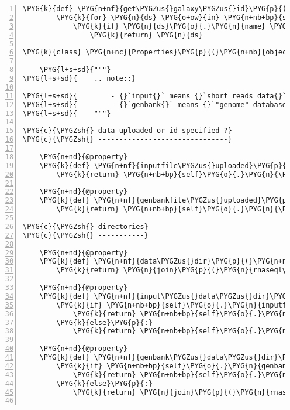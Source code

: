 \begin{Verbatim}[commandchars=\\\{\},numbers=left,firstnumber=1,stepnumber=5]
    \PYG{k}{def} \PYG{n+nf}{get\PYGZus{}galaxy\PYGZus{}id}\PYG{p}{(}\PYG{n+nb+bp}{self}\PYG{p}{,} \PYG{n}{name}\PYG{p}{)}\PYG{p}{:}
        \PYG{k}{for} \PYG{n}{ds} \PYG{o+ow}{in} \PYG{n+nb+bp}{self}\PYG{o}{.}\PYG{n}{galaxy\PYGZus{}datasets}\PYG{p}{:}
            \PYG{k}{if} \PYG{n}{ds}\PYG{o}{.}\PYG{n}{name} \PYG{o}{==} \PYG{n}{name}\PYG{p}{:}
                \PYG{k}{return} \PYG{n}{ds}

\PYG{k}{class} \PYG{n+nc}{Properties}\PYG{p}{(}\PYG{n+nb}{object}\PYG{p}{)}\PYG{p}{:}

    \PYG{l+s+sd}{"""}
\PYG{l+s+sd}{    .. note::}

\PYG{l+s+sd}{        - {}`input{}` means {}`short reads data{}`}
\PYG{l+s+sd}{        - {}`genbank{}` means {}`"genome" database nucleotide sequence{}`}
\PYG{l+s+sd}{    """}

\PYG{c}{\PYGZsh{} data uploaded or id specified ?}
\PYG{c}{\PYGZsh{} -------------------------------}

    \PYG{n+nd}{@property}
    \PYG{k}{def} \PYG{n+nf}{inputfile\PYGZus{}uploaded}\PYG{p}{(}\PYG{n+nb+bp}{self}\PYG{p}{)}\PYG{p}{:}
        \PYG{k}{return} \PYG{n+nb+bp}{self}\PYG{o}{.}\PYG{n}{\PYGZus{}inputfile\PYGZus{}name} \PYG{o+ow}{and} \PYG{n+nb+bp}{True}

    \PYG{n+nd}{@property}
    \PYG{k}{def} \PYG{n+nf}{genbankfile\PYGZus{}uploaded}\PYG{p}{(}\PYG{n+nb+bp}{self}\PYG{p}{)}\PYG{p}{:}
        \PYG{k}{return} \PYG{n+nb+bp}{self}\PYG{o}{.}\PYG{n}{\PYGZus{}genbankfile\PYGZus{}name} \PYG{o+ow}{and} \PYG{n+nb+bp}{True}

\PYG{c}{\PYGZsh{} directories}
\PYG{c}{\PYGZsh{} -----------}

    \PYG{n+nd}{@property}
    \PYG{k}{def} \PYG{n+nf}{data\PYGZus{}dir}\PYG{p}{(}\PYG{n+nb+bp}{self}\PYG{p}{)}\PYG{p}{:}
        \PYG{k}{return} \PYG{n}{join}\PYG{p}{(}\PYG{n}{rnaseqlyze}\PYG{o}{.}\PYG{n}{analyses\PYGZus{}path}\PYG{p}{,} \PYG{n+nb}{str}\PYG{p}{(}\PYG{n+nb+bp}{self}\PYG{o}{.}\PYG{n}{id}\PYG{p}{)}\PYG{p}{)}

    \PYG{n+nd}{@property}
    \PYG{k}{def} \PYG{n+nf}{input\PYGZus{}data\PYGZus{}dir}\PYG{p}{(}\PYG{n+nb+bp}{self}\PYG{p}{)}\PYG{p}{:}
        \PYG{k}{if} \PYG{n+nb+bp}{self}\PYG{o}{.}\PYG{n}{inputfile\PYGZus{}uploaded}\PYG{p}{:}
            \PYG{k}{return} \PYG{n+nb+bp}{self}\PYG{o}{.}\PYG{n}{data\PYGZus{}dir}
        \PYG{k}{else}\PYG{p}{:}
            \PYG{k}{return} \PYG{n+nb+bp}{self}\PYG{o}{.}\PYG{n}{rnaseq\PYGZus{}run}\PYG{o}{.}\PYG{n}{data\PYGZus{}dir}

    \PYG{n+nd}{@property}
    \PYG{k}{def} \PYG{n+nf}{genbank\PYGZus{}data\PYGZus{}dir}\PYG{p}{(}\PYG{n+nb+bp}{self}\PYG{p}{)}\PYG{p}{:}
        \PYG{k}{if} \PYG{n+nb+bp}{self}\PYG{o}{.}\PYG{n}{genbankfile\PYGZus{}uploaded}\PYG{p}{:}
            \PYG{k}{return} \PYG{n+nb+bp}{self}\PYG{o}{.}\PYG{n}{data\PYGZus{}dir}
        \PYG{k}{else}\PYG{p}{:}
            \PYG{k}{return} \PYG{n}{join}\PYG{p}{(}\PYG{n}{rnaseqlyze}\PYG{o}{.}\PYG{n}{shared\PYGZus{}data\PYGZus{}path}\PYG{p}{,} \PYG{n+nb+bp}{self}\PYG{o}{.}\PYG{n}{org\PYGZus{}accession}\PYG{p}{)}


\end{Verbatim}
